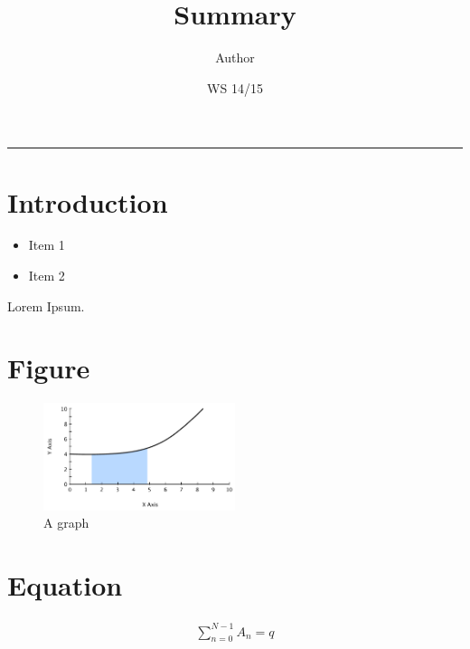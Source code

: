 \documentclass[11pt, oneside]{article}   	%
\title{Summary}
\author{Author}
\date{WS 14/15}							%
\begin{document}
\twocolumn
\maketitle
\tableofcontents
\noindent\rule{0.5\textwidth}{0.5pt}

\section{Introduction}
\begin{itemize}
	\item Item 1
	\item Item 2
\end{itemize}
Lorem Ipsum.

\section{Figure}
\begin{figure}[h!]
	\includegraphics[width=0.5\textwidth]{figures/graph}
	\caption{A graph}
\end{figure}

\section{Equation}
\begin{align}
	\sum_{n=0}^{N-1} A_n = q
\end{align}
\end{document}
